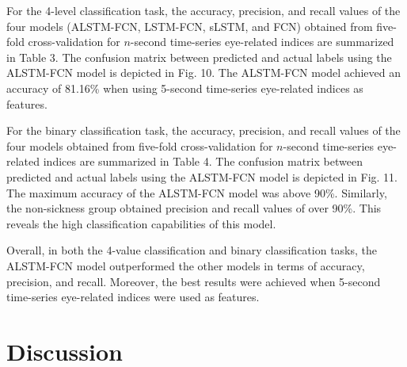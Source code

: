 \documentclass{ieeeaccess}
\begin{document}
For the 4-level classification task, the accuracy, precision, and recall values of the four models (ALSTM-FCN, LSTM-FCN, sLSTM, and FCN) obtained from five-fold cross-validation for $n$-second time-series eye-related indices are summarized in Table 3. The confusion matrix between predicted and actual labels using the ALSTM-FCN model is depicted in Fig. 10. The ALSTM-FCN model achieved an accuracy of 81.16\% when using 5-second time-series eye-related indices as features. 

For the binary classification task, the accuracy, precision, and recall values of the four models obtained from five-fold cross-validation for $n$-second time-series eye-related indices are summarized in Table 4. The confusion matrix between predicted and actual labels using the ALSTM-FCN model is depicted in Fig. 11. 
The maximum accuracy of the ALSTM-FCN model was above 90\%. Similarly, the non-sickness group obtained precision and recall values of over 90\%. This reveals the high classification capabilities of this model.

Overall, in both the 4-value classification and binary classification tasks, the ALSTM-FCN model outperformed the other models in terms of accuracy, precision, and recall. Moreover, the best results were achieved when 5-second time-series eye-related indices were used as features.







\section{Discussion}
\end{document}
